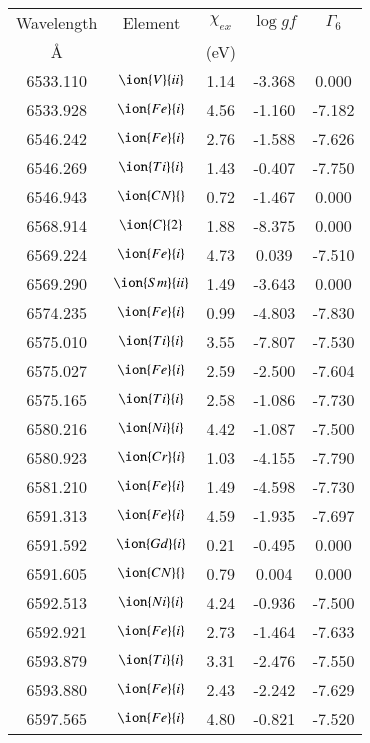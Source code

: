 \documentclass[fleqn,usenatbib]{mnras}
\begin{document}
\begin{center}
 \begin{table}
 \begin{tabular}{ccccc}
 \hline
 Wavelength & Element & $\chi_{ex}$ &  $\log gf$ & $\varGamma_{6}$ \\
   \AA{}    &         &  (eV)       &            &                  \\
 \hline
6533.110 &  $\ion{V}{ii}$  & 1.14 & -3.368 & 0.000 \\ 
6533.928 &  $\ion{Fe}{i}$  & 4.56 & -1.160 & -7.182 \\ 
6546.242 &  $\ion{Fe}{i}$  & 2.76 & -1.588 & -7.626 \\ 
6546.269 &  $\ion{Ti}{i}$  & 1.43 & -0.407 & -7.750 \\ 
6546.943 & $\ion{CN}{}$ & 0.72 & -1.467 & 0.000 \\ 
6568.914 &  $\ion{C}{2}$ & 1.88 & -8.375 & 0.000 \\ 
6569.224 &  $\ion{Fe}{i}$  & 4.73 & 0.039 & -7.510 \\ 
6569.290 &  $\ion{Sm}{ii}$  & 1.49 & -3.643 & 0.000 \\ 
6574.235 &  $\ion{Fe}{i}$  & 0.99 & -4.803 & -7.830 \\ 
6575.010 &  $\ion{Ti}{i}$  & 3.55 & -7.807 & -7.530 \\ 
6575.027 &  $\ion{Fe}{i}$  & 2.59 & -2.500 & -7.604 \\ 
6575.165 &  $\ion{Ti}{i}$  & 2.58 & -1.086 & -7.730 \\ 
6580.216 &  $\ion{Ni}{i}$  & 4.42 & -1.087 & -7.500 \\ 
6580.923 &  $\ion{Cr}{i}$  & 1.03 & -4.155 & -7.790 \\ 
6581.210 &  $\ion{Fe}{i}$  & 1.49 & -4.598 & -7.730 \\ 
6591.313 &  $\ion{Fe}{i}$  & 4.59 & -1.935 & -7.697 \\ 
6591.592 &  $\ion{Gd}{i}$  & 0.21 & -0.495 & 0.000 \\ 
6591.605 & $\ion{CN}{}$ & 0.79 & 0.004 & 0.000 \\ 
6592.513 &  $\ion{Ni}{i}$  & 4.24 & -0.936 & -7.500 \\ 
6592.921 &  $\ion{Fe}{i}$  & 2.73 & -1.464 & -7.633 \\ 
6593.879 &  $\ion{Ti}{i}$  & 3.31 & -2.476 & -7.550 \\ 
6593.880 &  $\ion{Fe}{i}$  & 2.43 & -2.242 & -7.629 \\ 
6597.565 &  $\ion{Fe}{i}$  & 4.80 & -0.821 & -7.520 \\ 

\end{tabular}
\end{table}
\end{center}
\end{document}
